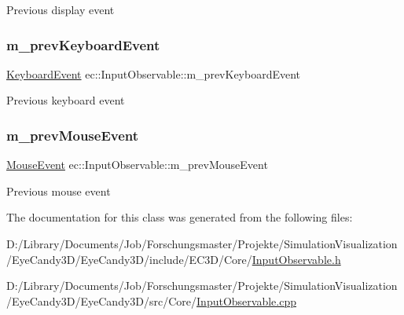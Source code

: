 Previous display event \mbox{\label{classec_1_1_input_observable_acf14cdeb5a394fbd296ff3dfb391c14f}} 
\subsubsection{\texorpdfstring{m\+\_\+prev\+Keyboard\+Event}{m\_prevKeyboardEvent}}
{\footnotesize\ttfamily \mbox{\hyperlink{structec_1_1_keyboard_event}{Keyboard\+Event}} ec\+::\+Input\+Observable\+::m\+\_\+prev\+Keyboard\+Event\hspace{0.3cm}{\ttfamily [protected]}}

Previous keyboard event \mbox{\label{classec_1_1_input_observable_a99e8c1484fe87503096e681d8bd3b75f}} 
\subsubsection{\texorpdfstring{m\+\_\+prev\+Mouse\+Event}{m\_prevMouseEvent}}
{\footnotesize\ttfamily \mbox{\hyperlink{structec_1_1_mouse_event}{Mouse\+Event}} ec\+::\+Input\+Observable\+::m\+\_\+prev\+Mouse\+Event\hspace{0.3cm}{\ttfamily [protected]}}

Previous mouse event 

The documentation for this class was generated from the following files\+:\begin{DoxyCompactItemize}
\item 
D\+:/\+Library/\+Documents/\+Job/\+Forschungsmaster/\+Projekte/\+Simulation\+Visualization/\+Eye\+Candy3\+D/\+Eye\+Candy3\+D/include/\+E\+C3\+D/\+Core/\mbox{\hyperlink{_input_observable_8h}{Input\+Observable.\+h}}\item 
D\+:/\+Library/\+Documents/\+Job/\+Forschungsmaster/\+Projekte/\+Simulation\+Visualization/\+Eye\+Candy3\+D/\+Eye\+Candy3\+D/src/\+Core/\mbox{\hyperlink{_input_observable_8cpp}{Input\+Observable.\+cpp}}\end{DoxyCompactItemize}

